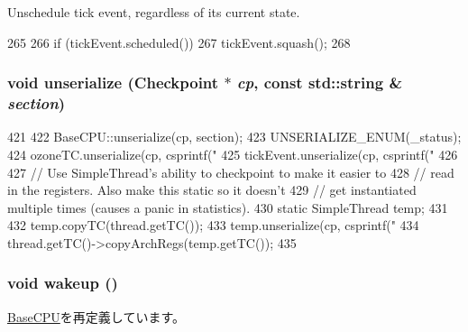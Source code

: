 Unschedule tick event, regardless of its current state. 


\begin{DoxyCode}
265     {
266         if (tickEvent.scheduled())
267             tickEvent.squash();
268     }
\end{DoxyCode}
\hypertarget{classOzoneCPU_af22e5d6d660b97db37003ac61ac4ee49}{
\subsubsection[{unserialize}]{\setlength{\rightskip}{0pt plus 5cm}void unserialize ({\bf Checkpoint} $\ast$ {\em cp}, \/  const std::string \& {\em section})}}
\label{classOzoneCPU_af22e5d6d660b97db37003ac61ac4ee49}



\begin{DoxyCode}
421 {
422     BaseCPU::unserialize(cp, section);
423     UNSERIALIZE_ENUM(_status);
424     ozoneTC.unserialize(cp, csprintf("%
425     tickEvent.unserialize(cp, csprintf("%
426 
427     // Use SimpleThread's ability to checkpoint to make it easier to
428     // read in the registers.  Also make this static so it doesn't
429     // get instantiated multiple times (causes a panic in statistics).
430     static SimpleThread temp;
431 
432     temp.copyTC(thread.getTC());
433     temp.unserialize(cp, csprintf("%
434     thread.getTC()->copyArchRegs(temp.getTC());
435 }
\end{DoxyCode}
\hypertarget{classOzoneCPU_ae674290a26ecbd622c5160e38e8a4fe9}{
\subsubsection[{wakeup}]{\setlength{\rightskip}{0pt plus 5cm}void wakeup ()}}
\label{classOzoneCPU_ae674290a26ecbd622c5160e38e8a4fe9}


\hyperlink{classBaseCPU_a75101f8aee74078c8c3c1d1f3617f7cc}{BaseCPU}を再定義しています。


